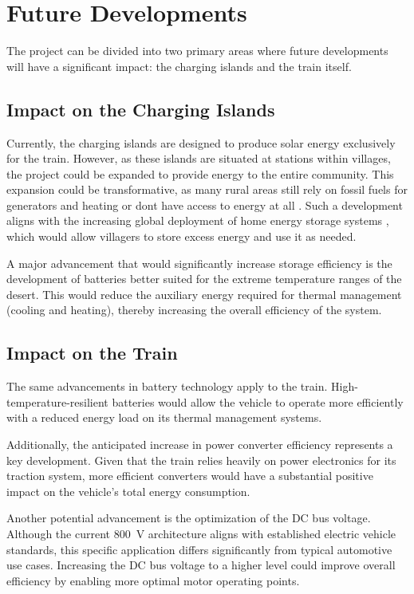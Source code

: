 \section{Future Developments}\label{sec:future_dev}

The project can be divided into two primary areas where future developments will have a significant impact: the charging islands and the train itself.

\subsection{Impact on the Charging Islands}
Currently, the charging islands are designed to produce solar energy exclusively for the train. However, as these islands are situated at stations within villages, the project could be expanded to provide energy to the entire community. This expansion could be transformative, as many rural areas still rely on fossil fuels for generators and heating or dont have access to energy at all \cite{DOMEGNI2022112298}. Such a development aligns with the increasing global deployment of home energy storage systems \cite{ElectrekArticle2024}, which would allow villagers to store excess energy and use it as needed.

A major advancement that would significantly increase storage efficiency is the development of batteries better suited for the extreme temperature ranges of the desert. This would reduce the auxiliary energy required for thermal management (cooling and heating), thereby increasing the overall efficiency of the system.

\subsection{Impact on the Train}
The same advancements in battery technology apply to the train. High-temperature-resilient batteries would allow the vehicle to operate more efficiently with a reduced energy load on its thermal management systems.

Additionally, the anticipated increase in power converter efficiency \cite{ChargedEVsArticle} represents a key development. Given that the train relies heavily on power electronics for its traction system, more efficient converters would have a substantial positive impact on the vehicle's total energy consumption.

Another potential advancement is the optimization of the DC bus voltage. Although the current 800~V architecture aligns with established electric vehicle standards, this specific application differs significantly from typical automotive use cases. Increasing the DC bus voltage to a higher level could improve overall efficiency by enabling more optimal motor operating points.